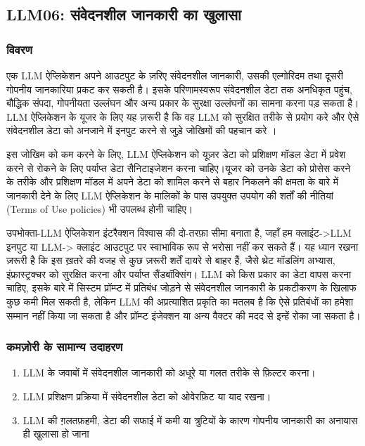 \documentclass[
]{article}
\author{}
\date{}
\providecommand{\tightlist}{%
  \setlength{\itemsep}{0pt}\setlength{\parskip}{0pt}}
\begin{document}
\subsection{LLM06: संवेदनशील जानकारी का
खुलासा}\label{llm06-ux938ux935ux926ux928ux936ux932-ux91cux928ux915ux930-ux915-ux916ux932ux938}

\subsubsection{विवरण}\label{ux935ux935ux930ux923}

एक LLM ऐप्लिकेशन अपने आउटपुट के ज़रिए संवेदनशील जानकारी, उसकी एल्गोरिदम तथा दूसरी
गोपनीय जानकारिया प्रकट कर सकती है। इसके परिणामस्वरूप संवेदनशील डेटा तक अनधिकृत
पहुंच, बौद्धिक संपदा, गोपनीयता उल्लंघन और अन्य प्रकार के सुरक्षा उल्लंघनों का सामना
करना पड़ सकता है। LLM ऐप्लिकेशन के यूजर के लिए यह ज़रूरी है कि वह LLM को सुरक्षित
तरीके से प्रयोग करे और ऐसे संवेदनशील डेटा को अनजाने में इनपुट करने से जुड़े जोखिमों की
पहचान करे ।

इस जोखिम को कम करने के लिए, LLM ऐप्लिकेशन को यूज़र डेटा को प्रशिक्षण मॉडल डेटा में
प्रवेश करने से रोकने के लिए पर्याप्त डेटा सैनिटाइजेशन करना चाहिए।यूजर को उनके डेटा को
प्रोसेस करने के तरीके और प्रशिक्षण मॉडल में अपने डेटा को शामिल करने से बहार निकलने की
क्षमता के बारे में जानकारी देने के लिए LLM ऐप्लिकेशन के मालिकों के पास उपयुक्त उपयोग की
शर्तों की नीतियां (Terms of Use policies) भी उपलब्ध होनी चाहिए।

उपभोक्ता-LLM ऐप्लिकेशन इंटरैक्शन विश्वास की दो-तरफ़ा सीमा बनाता है, जहाँ हम
क्लाइंट-\textgreater LLM इनपुट या LLM-\textgreater{} क्लाइंट आउटपुट पर
स्वाभाविक रूप से भरोसा नहीं कर सकते हैं। यह ध्यान रखना ज़रूरी है कि इस ख़तरे की वजह से
कुछ ज़रूरी शर्तें दायरे से बाहर हैं, जैसे थ्रेट मॉडलिंग अभ्यास, इंफ्रास्ट्रक्चर को सुरक्षित
करना और पर्याप्त सैंडबॉक्सिंग। LLM को किस प्रकार का डेटा वापस करना चाहिए, इसके
बारे में सिस्टम प्रॉम्प्ट में प्रतिबंध जोड़ने से संवेदनशील जानकारी के प्रकटीकरण के खिलाफ कुछ
कमी मिल सकती है, लेकिन LLM की अप्रत्याशित प्रकृति का मतलब है कि ऐसे प्रतिबंधों का
हमेशा सम्मान नहीं किया जा सकता है और प्रॉम्प्ट इंजेक्शन या अन्य वैक्टर की मदद से इन्हें
रोका जा सकता है।

\subsubsection{कमज़ोरी के सामान्य
उदाहरण}\label{ux915ux92eux95bux930-ux915-ux938ux92eux928ux92f-ux909ux926ux939ux930ux923}

\begin{enumerate}
\def\labelenumi{\arabic{enumi}.}
\tightlist
\item
  LLM के जवाबों में संवेदनशील जानकारी को अधूरे या गलत तरीके से फ़िल्टर करना।
\item
  LLM प्रशिक्षण प्रक्रिया में संवेदनशील डेटा को ओवेरफ़िट या याद रखना।
\item
  LLM की ग़लतफ़हमी, डेटा की सफाई में कमी या त्रुटियों के कारण गोपनीय जानकारी का
  अनायास ही खुलासा हो जाना
\end{enumerate}
\end{document}
